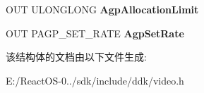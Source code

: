 \begin{DoxyCompactItemize}
\item 
\mbox{\label{struct___v_i_d_e_o___p_o_r_t___a_g_p___i_n_t_e_r_f_a_c_e__2_a8f555fb3114ebce6ac1024ee3fbac534}} 
O\+UT U\+L\+O\+N\+G\+L\+O\+NG {\bfseries Agp\+Allocation\+Limit}
\item 
\mbox{\label{struct___v_i_d_e_o___p_o_r_t___a_g_p___i_n_t_e_r_f_a_c_e__2_a8e9adc4a23fa0730a25a153ac7c31b31}} 
O\+UT P\+A\+G\+P\+\_\+\+S\+E\+T\+\_\+\+R\+A\+TE {\bfseries Agp\+Set\+Rate}
\end{DoxyCompactItemize}


该结构体的文档由以下文件生成\+:\begin{DoxyCompactItemize}
\item 
E\+:/\+React\+O\+S-\/0../sdk/include/ddk/video.\+h\end{DoxyCompactItemize}
